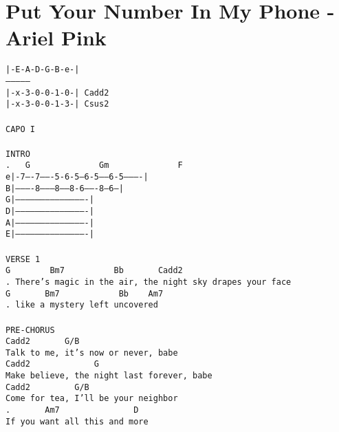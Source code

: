 \newpage
\section{Put Your Number In My Phone - Ariel Pink}
\label{Put Your Number In My Phone - Ariel Pink}
\texttt{|-E-A-D-G-B-e-|\\
---------------\\
|-x-3-0-0-1-0-|\ Cadd2\\
|-x-3-0-0-1-3-|\ Csus2\\
\\
CAPO\ I\\
\\
INTRO\\
. \ \ G\ \ \ \ \ \ \ \ \ \ \ \ \ \ Gm\ \ \ \ \ \ \ \ \ \ \ \ \ \ F\\
e|-7----7-------5-6-5---6-5-----6-5----------|\\
B|----------8---------8-----8-6-------8--6---|\\
G|-------------------------------------------|\\
D|-------------------------------------------|\\
A|-------------------------------------------|\\
E|-------------------------------------------|\\
\\
VERSE\ 1\\
G\ \ \ \ \ \ \ \ Bm7\ \ \ \ \ \ \ \ \ \ Bb\ \ \ \ \ \ \ Cadd2\\
. There's\ magic\ in\ the\ air,\ the\ night\ sky\ drapes\ your\ face\ \\
G\ \ \ \ \ \ \ Bm7\ \ \ \ \ \ \ \ \ \ \ \ Bb\ \ \ \ Am7\\
. like\ a\ mystery\ left\ uncovered\\
\\
PRE-CHORUS\\
Cadd2\ \ \ \ \ \ \ G/B\\
Talk\ to\ me,\ it's\ now\ or\ never,\ babe\\
Cadd2\ \ \ \ \ \ \ \ \ \ \ \ \ G\\
Make\ believe,\ the\ night\ last\ forever,\ babe\\
Cadd2\ \ \ \ \ \ \ \ \ G/B\\
Come\ for\ tea,\ I'll\ be\ your\ neighbor\\
. \ \ \ \ \ \ Am7\ \ \ \ \ \ \ \ \ \ \ \ \ \ \ D\\
If\ you\ want\ all\ this\ and\ more\\
\\
}

